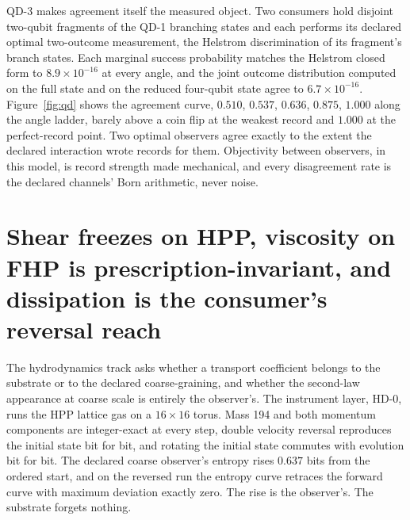 \documentclass[aps,pre,reprint,nofootinbib,floatfix]{revtex4-2}
\begin{document}
QD-3 makes agreement itself the measured object.  Two consumers
hold disjoint two-qubit fragments of the QD-1 branching states and
each performs its declared optimal two-outcome measurement, the
Helstrom discrimination of its fragment's branch states.  Each
marginal success probability matches the Helstrom closed form
\cite{Helstrom1976} to $8.9\times10^{-16}$ at every angle, and the
joint outcome distribution computed on the full state and on the
reduced four-qubit state agree to $6.7\times10^{-16}$.
Figure~\ref{fig:qd} shows the agreement curve, $0.510$, $0.537$,
$0.636$, $0.875$, $1.000$ along the angle ladder, barely above a
coin flip at the weakest record and $1.000$ at the perfect-record
point.
Two optimal observers agree exactly to the extent the declared
interaction wrote records for them.  Objectivity between observers,
in this model, is record strength made mechanical, and every
disagreement rate is the declared channels' Born arithmetic, never
noise.

\section{Shear freezes on HPP, viscosity on FHP is
prescription-invariant, and dissipation is the consumer's reversal
reach}
\label{sec:hd}

The hydrodynamics track asks whether a transport coefficient
belongs to the substrate or to the declared coarse-graining, and
whether the second-law appearance at coarse scale is entirely the
observer's.  The instrument layer, HD-0, runs the HPP lattice gas
\cite{HPP1976} on a $16\times16$ torus.  Mass 194 and both momentum
components are integer-exact at every step, double velocity
reversal reproduces the initial state bit for bit, and rotating
the initial state commutes with evolution bit for bit.  The
declared coarse observer's entropy rises $0.637$ bits from the
ordered start, and on the reversed run the entropy curve retraces
the forward curve with maximum deviation exactly zero.  The rise is
the observer's.  The substrate forgets nothing.
\end{document}
